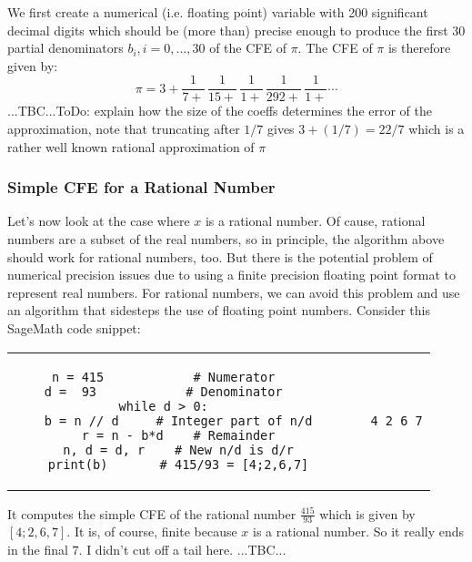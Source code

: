 We first create a numerical (i.e. floating point) variable with 200 significant decimal digits which should be (more than) precise enough to produce the first 30 partial denominators $b_i, i = 0,\ldots,30$ of the CFE of $\pi$. The CFE of $\pi$ is therefore given by:
\begin{equation}
\pi = 3 + \frac{1}{7 +} \, \frac{1}{15+} \, \frac{1}{1 +} \, \frac{1}{292 +} \, \frac{1}{1 +} \cdots
\end{equation}
...TBC...ToDo: explain how the size of the coeffs determines the error of the approximation, note that truncating after $1/7$ gives $3 + (1/7) = 22/7$ which is a rather well known rational approximation of $\pi$



\subsubsection{Simple CFE for a Rational Number}
Let's now look at the case where $x$ is a rational number. Of cause, rational numbers are a subset of the real numbers, so in principle, the algorithm above should work for rational numbers, too. But there is the potential problem of numerical precision issues due to using a finite precision floating point format to represent real numbers. For rational numbers, we can avoid this problem and use an algorithm that sidesteps the use of floating point numbers. Consider this SageMath code snippet:
\begin{center}
\begin{tabular}{ ccccc } 
\begin{lstlisting}
n = 415            # Numerator
d =  93            # Denominator
while d > 0:
    b = n // d     # Integer part of n/d
    r = n - b*d    # Remainder
    n, d = d, r    # New n/d is d/r
    print(b)       # 415/93 = [4;2,6,7]
\end{lstlisting}
& & \vline & &
\begin{lstlisting}
4 2 6 7
\end{lstlisting}
\end{tabular}
\end{center}
It computes the simple CFE of the rational number $\frac{415}{93}$ which is given by $[4;2,6,7]$. It is, of course, finite because $x$ is a rational number. So it really ends in the final $7$. I didn't cut off a tail here. ...TBC...

